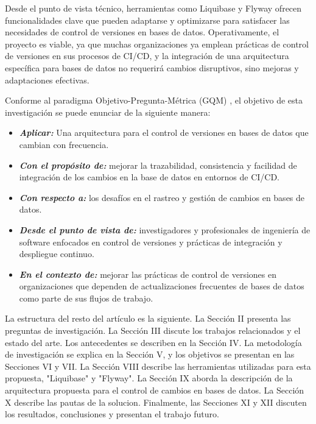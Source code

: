 \documentclass{IEEEtran}
\begin{document}
Desde el punto de vista técnico, herramientas como Liquibase y Flyway ofrecen funcionalidades clave que pueden adaptarse y optimizarse para satisfacer las necesidades de control de versiones en bases de datos.
Operativamente, el proyecto es viable, ya que muchas organizaciones ya emplean prácticas de control de versiones en sus procesos de CI/CD, y la integración de una arquitectura específica para bases de datos no requerirá cambios disruptivos, sino mejoras y adaptaciones efectivas.

Conforme al paradigma Objetivo-Pregunta-Métrica (GQM) \cite{Basili1992}, el objetivo de esta investigación se puede enunciar de la siguiente manera:

\begin{itemize}
    \item[] {\textbf{\textit{Aplicar:}}} Una arquitectura para el control de versiones en bases de datos que cambian con frecuencia.
    \item[] {\textbf{\textit{Con el propósito de:}}} mejorar la trazabilidad, consistencia y facilidad de integración de los cambios en la base de datos en entornos de CI/CD.
    \item[] {\textbf{\textit{Con respecto a:}}} los desafíos en el rastreo y gestión de cambios en bases de datos.
    \item[] {\textbf{\textit{Desde el punto de vista de:}}} investigadores y profesionales de ingeniería de software enfocados en control de versiones y prácticas de integración y despliegue continuo.
    \item[] {\textbf{\textit{En el contexto de:}}} mejorar las prácticas de control de versiones en organizaciones que dependen de actualizaciones frecuentes de bases de datos como parte de sus flujos de trabajo.
\end{itemize}


\vspace{0.5cm}
La estructura del resto del artículo es la siguiente. La Sección II presenta las preguntas de investigación. La Sección III discute los trabajos relacionados y el estado del arte. Los antecedentes se describen en la Sección IV. La metodología de investigación se explica en la Sección V, y los objetivos se presentan en las Secciones VI y VII. La Sección VIII describe las herramientas utilizadas para esta propuesta, "Liquibase" y "Flyway". La Sección IX aborda la descripción de la arquitectura propuesta para el control de cambios en bases de datos. La Sección X describe las pautas de la solucion. Finalmente, las Secciones XI y XII discuten los resultados, conclusiones y presentan el trabajo futuro.
\end{document}
